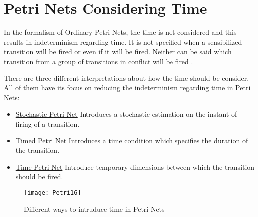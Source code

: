 \section{Petri Nets Considering Time}
	
	In the formalism of Ordinary Petri Nets, the time is not considered and this results in 
	indeterminism regarding time. It is not specified when a sensibilized transition will be fired 
	or even if it will be fired. Neither can be said which transition from a group of transitions in
	 conflict will be fired \cite{garcia_izquierdo}.
	
	There are three different interpretations about how the time should be consider. All of them 
	have its focus on reducing the indeterminism regarding time in Petri Nets: 
	\begin{itemize}
	  	\renewcommand{\theenumi}{\Alph{enumi}}
	  	\item \underline{Stochastic Petri Net}
			Introduces a stochastic estimation on the instant of firing of a transition.
		\item \underline{Timed Petri Net}
			Introduces a time condition which specifies the duration of the transition.
		\item \underline{Time Petri Net}
			Introduce temporary dimensions between which the transition should be fired.
	\end{itemize}
	
	\begin{figure}[h]
		\centering
		\texttt{[image: Petri16]}
		\caption{Different ways to intruduce time in Petri Nets}
		\label{fig:Petri16}
	\end{figure}
	
